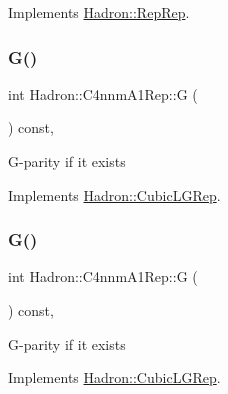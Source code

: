 Implements \mbox{\hyperlink{structHadron_1_1RepRep_a92c8802e5ed7afd7da43ccfd5b7cd92b}{Hadron\+::\+Rep\+Rep}}.

\mbox{\label{structHadron_1_1C4nnmA1Rep_a6513c68696ac96b69cbe1e429364d99c}} 
\subsubsection{\texorpdfstring{G()}{G()}\hspace{0.1cm}{\footnotesize\ttfamily [1/3]}}
{\footnotesize\ttfamily int Hadron\+::\+C4nnm\+A1\+Rep\+::G (\begin{DoxyParamCaption}{ }\end{DoxyParamCaption}) const\hspace{0.3cm}{\ttfamily [inline]}, {\ttfamily [virtual]}}

G-\/parity if it exists 

Implements \mbox{\hyperlink{structHadron_1_1CubicLGRep_ace26f7b2d55e3a668a14cb9026da5231}{Hadron\+::\+Cubic\+L\+G\+Rep}}.

\mbox{\label{structHadron_1_1C4nnmA1Rep_a6513c68696ac96b69cbe1e429364d99c}} 
\subsubsection{\texorpdfstring{G()}{G()}\hspace{0.1cm}{\footnotesize\ttfamily [2/3]}}
{\footnotesize\ttfamily int Hadron\+::\+C4nnm\+A1\+Rep\+::G (\begin{DoxyParamCaption}{ }\end{DoxyParamCaption}) const\hspace{0.3cm}{\ttfamily [inline]}, {\ttfamily [virtual]}}

G-\/parity if it exists 

Implements \mbox{\hyperlink{structHadron_1_1CubicLGRep_ace26f7b2d55e3a668a14cb9026da5231}{Hadron\+::\+Cubic\+L\+G\+Rep}}.

\mbox{\label{structHadron_1_1C4nnmA1Rep_a6513c68696ac96b69cbe1e429364d99c}} 
